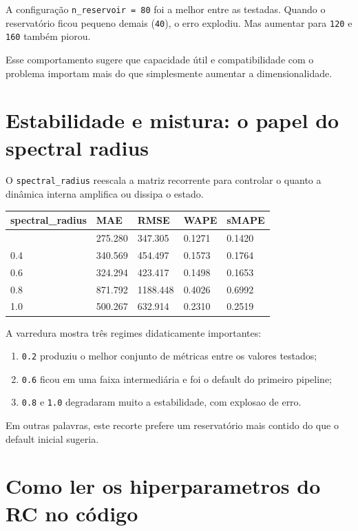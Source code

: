\documentclass[12pt]{article}
\providecommand{\tightlist}{%
              \setlength{\itemsep}{0pt}\setlength{\parskip}{0pt}}
\begin{document}
A configuração \texttt{n\_reservoir\ =\ 80} foi a melhor entre as testadas. Quando o reservatório ficou pequeno demais (\texttt{40}), o erro explodiu. Mas aumentar para \texttt{120} e \texttt{160} também piorou.

Esse comportamento sugere que capacidade útil e compatibilidade com o problema importam mais do que simplesmente aumentar a dimensionalidade.

\section{Estabilidade e mistura: o papel do spectral radius}\label{5-estabilidade-e-mistura-o-papel-do-spectral-radius}

O \texttt{spectral\_radius} reescala a matriz recorrente para controlar o quanto a dinâmica interna amplifica ou dissipa o estado.

\begin{longtable}[]{@{}lllll@{}}
\toprule\noalign{}
spectral\_radius & MAE & RMSE & WAPE & sMAPE \\
\midrule\noalign{}
\endhead
\bottomrule\noalign{}
\endlastfoot
0.2 & 275.280 & 347.305 & 0.1271 & 0.1420 \\
0.4 & 340.569 & 454.497 & 0.1573 & 0.1764 \\
0.6 & 324.294 & 423.417 & 0.1498 & 0.1653 \\
0.8 & 871.792 & 1188.448 & 0.4026 & 0.6992 \\
1.0 & 500.267 & 632.914 & 0.2310 & 0.2519 \\
\end{longtable}

A varredura mostra três regimes didaticamente importantes:

\begin{enumerate}
\def\labelenumi{\arabic{enumi}.}
\tightlist
\item
  \texttt{0.2} produziu o melhor conjunto de métricas entre os valores testados;
\item
  \texttt{0.6} ficou em uma faixa intermediária e foi o default do primeiro pipeline;
\item
  \texttt{0.8} e \texttt{1.0} degradaram muito a estabilidade, com explosao de erro.
\end{enumerate}

Em outras palavras, este recorte prefere um reservatório mais contido do que o default inicial sugeria.

\section{Como ler os hiperparametros do RC no código}\label{6-como-ler-os-hiperparametros-do-rc-no-cuxf3digo}
\end{document}
